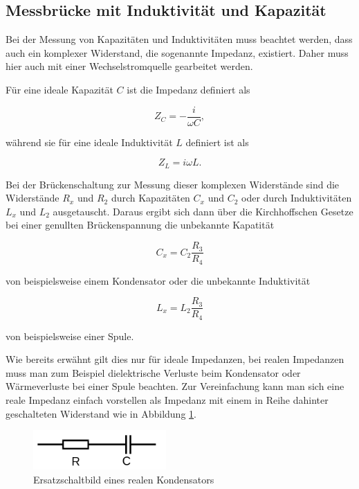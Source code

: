 \subsection{Messbrücke mit Induktivität und Kapazität}

Bei der Messung von Kapazitäten und Induktivitäten muss beachtet werden, dass
auch ein komplexer Widerstand, die sogenannte Impedanz, existiert.
Daher muss hier auch mit einer Wechselstromquelle gearbeitet werden.

\newpage

Für eine ideale Kapazität $C$ ist die Impedanz definiert als

\begin{equation}
  Z_C = - \frac{i}{\omega C} ,
\end{equation}

während sie für eine ideale Induktivität $L$ definiert ist als

\begin{equation}
  Z_L = i \omega L .
\end{equation}

Bei der Brückenschaltung zur Messung dieser komplexen Widerstände sind
die Widerstände $R_x$ und $R_2$ durch Kapazitäten $C_x$ und $C_2$ oder
durch Induktivitäten $L_x$ und $L_2$ ausgetauscht.
Daraus ergibt sich dann über die Kirchhoffschen Gesetze bei einer
genullten Brückenspannung die unbekannte Kapatität

\begin{equation}
  C_x = C_2\frac{R_3}{R_4}
  \label{eqn:KapId}
\end{equation}

von beispielsweise einem Kondensator oder die unbekannte Induktivität

\begin{equation}
  L_x = L_2\frac{R_3}{R_4}
  \label{eqn:IndId}
\end{equation}

von beispielsweise einer Spule.

Wie bereits erwähnt gilt dies nur für ideale Impedanzen, bei realen
Impedanzen muss man zum Beispiel dielektrische Verluste beim Kondensator
oder Wärmeverluste bei einer Spule beachten. Zur Vereinfachung kann man
sich eine reale Impedanz einfach vorstellen als Impedanz mit einem in Reihe
dahinter geschalteten Widerstand wie in Abbildung \ref{fig:ReiheImp}.

\begin{figure}
  \centering
  \includegraphics[height=1.5cm]{ReiheImp.png}
  \caption{Ersatzschaltbild eines realen Kondensators}
  \label{fig:ReiheImp}
\end{figure}

